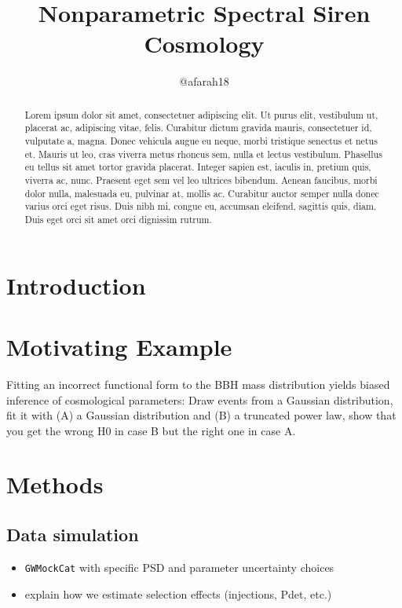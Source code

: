 \documentclass[]{aastex631}
\begin{document}
\title{Nonparametric Spectral Siren Cosmology}

\author{@afarah18}

\begin{abstract}
    Lorem ipsum dolor sit amet, consectetuer adipiscing elit.
    Ut purus elit, vestibulum ut, placerat ac, adipiscing vitae, felis.
    Curabitur dictum gravida mauris, consectetuer id, vulputate a, magna.
    Donec vehicula augue eu neque, morbi tristique senectus et netus et.
    Mauris ut leo, cras viverra metus rhoncus sem, nulla et lectus vestibulum.
    Phasellus eu tellus sit amet tortor gravida placerat.
    Integer sapien est, iaculis in, pretium quis, viverra ac, nunc.
    Praesent eget sem vel leo ultrices bibendum.
    Aenean faucibus, morbi dolor nulla, malesuada eu, pulvinar at, mollis ac.
    Curabitur auctor semper nulla donec varius orci eget risus.
    Duis nibh mi, congue eu, accumsan eleifend, sagittis quis, diam.
    Duis eget orci sit amet orci dignissim rutrum.
\end{abstract}

\section{Introduction}
\label{sec:intro}

\section{Motivating Example}
Fitting an incorrect functional form to the BBH mass distribution yields biased inference of cosmological parameters: Draw events from a Gaussian distribution, fit it with (A) a Gaussian distribution and (B) a truncated power law, show that you get the wrong H0 in case B but the right one in case A.
\section{Methods}
\label{sec:methods}
\subsection{Data simulation}
\begin{itemize}
    \item \texttt{GWMockCat} with specific PSD and parameter uncertainty choices
    \item explain how we estimate selection effects (injections, Pdet, etc.)
\end{itemize}
\end{document}
